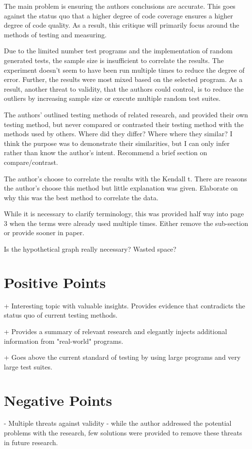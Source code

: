 \documentclass[conference]{IEEEtran}
\begin{document}
The main problem is ensuring the authors conclusions are accurate. This goes against the status quo that a higher degree of code coverage ensures a higher degree of code quality. As a result, this critique will primarily focus around the methods of testing and measuring.  

Due to the limited number test programs and the implementation of random generated tests, the sample size is insufficient to correlate the results. The experiment doesn't seem to have been run multiple times to reduce the degree of error. Further, the results were most mixed based on the selected program. As a result, another threat to validity, that the authors could control, is to reduce the outliers by increasing sample size or execute multiple random test suites. 

The authors' outlined testing methods of related research, and provided their own testing method, but never compared or contrasted their testing method with the methods used by others. Where did they differ? Where where they similar? I think the purpose was to demonstrate their similarities, but I can only infer rather than know the author's intent. Recommend a brief section on compare/contrast.

The author's choose to correlate the results with the Kendall t. There are reasons the author's choose this method but little explanation was given. Elaborate on why this was the best method to correlate the data. 

While it is necessary to clarify terminology, this was provided half way into page 3 when the terms were already used multiple times. Either remove the sub-section or provide sooner in paper.

Is the hypothetical graph really necessary? Wasted space?

\section{Positive Points}
+ Interesting topic with valuable insights. Provides evidence that contradicts the status quo of current testing methods.

+ Provides a summary of relevant research and elegantly injects additional information from "real-world" programs. 

+ Goes above the current standard of testing by using large programs and very large test suites.

\section{Negative Points}
- Multiple threats against validity - while the author addressed the potential problems with the research, few solutions were provided to remove these threats in future research.
 
\end{document}
